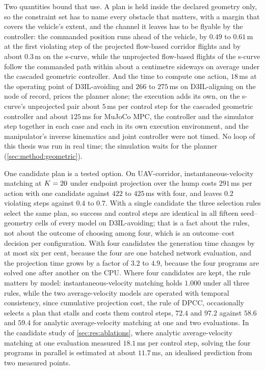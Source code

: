 Two quantities bound that use. A plan is held inside the declared geometry only, so the constraint set
has to name every obstacle that matters, with a margin that covers the vehicle's extent, and the
channel it leaves has to be flyable by the controller: the commanded position runs ahead of the
vehicle, by $0.49$ to $0.61$\,m at the first violating step of the projected flow-based corridor
flights and by about $0.3$\,m on the s-curve, while the unprojected flow-based flights of the s-curve
follow the commanded path within about a centimetre sideways on average under the cascaded geometric
controller. And the time to compute one action, $18$\,ms at
the operating point of D3IL-avoiding and $266$ to $275$\,ms on D3IL-aligning on the node of record,
prices the planner alone; the execution adds its own, on the s-curve's unprojected pair about
$5$\,ms per control step for the cascaded geometric controller and about $125$\,ms for MuJoCo MPC,
the controller and the simulator step together in each case and each in its own execution
environment, and the manipulator's inverse kinematics and joint controller were not timed. No loop of this thesis was run in real time;
the simulation waits for the planner (\autoref{sec:method:geometric}).

One candidate plan is a tested option. On UAV-corridor, instantaneous-velocity matching at $K = 20$
under endpoint projection over the hump costs $291$\,ms per action with one candidate against $422$
to $425$\,ms with four, and leaves $0.2$ violating steps against $0.4$ to $0.7$. With a single
candidate the three selection rules select the same plan, so success and control steps are identical
in all fifteen seed--geometry cells of every model on D3IL-avoiding; that is a fact about the rules,
not about the outcome of choosing among four, which is an outcome--cost decision per configuration.
With four candidates the generation time changes by at most six per cent, because the four are one
batched network evaluation, and the projection time grows by a factor of $3.2$ to $4.9$, because the
four programs are solved one after another on the CPU. Where four candidates are kept, the rule
matters by model: instantaneous-velocity matching holds $1.000$ under all three rules, while the two
average-velocity models are operated with temporal consistency, since cumulative projection cost, the
rule of \ac{DPCC}, occasionally selects a plan that stalls and costs them control steps, $72.4$ and
$97.2$ against $58.6$ and $59.4$ for analytic average-velocity matching at one and two evaluations.
In the candidate study of \autoref{sec:res:ablations}, where analytic average-velocity matching at one
evaluation measured $18.1$\,ms per control step, solving the four programs in parallel is estimated
at about $11.7$\,ms, an idealised prediction from two measured points.

